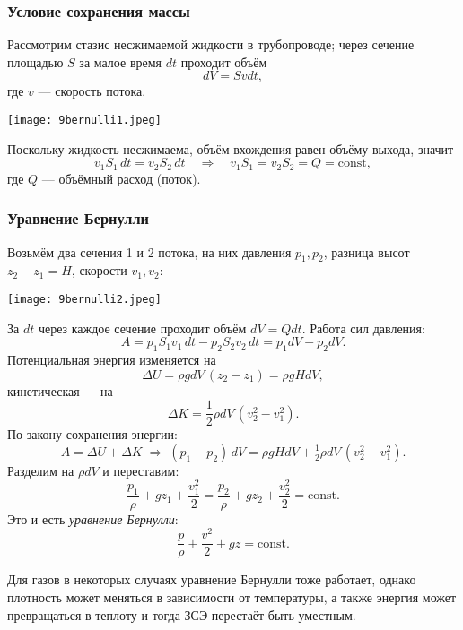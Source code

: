 \documentclass[12pt, a4paper]{article}%
\begin{document}
\subsubsection*{Условие сохранения массы}
Рассмотрим стазис несжимаемой жидкости в трубопроводе; через сечение площадью $S$ за малое время $dt$ проходит объём
\[
dV = Svdt,
\]
где $v$ — скорость потока.

\begin{center}
\texttt{[image: 9bernulli1.jpeg]}
\label{fig:mpr}
\end{center}


Поскольку жидкость несжимаема, объём вхождения равен объёму выхода, значит
\[
v_1 S_1\,dt = v_2 S_2\,dt
\quad\Longrightarrow\quad
v_1 S_1 = v_2 S_2 = Q = \text{const},
\]
где $Q$ — объёмный расход (поток).

\subsubsection*{Уравнение Бернулли}
Возьмём два сечения 1 и 2 потока, на них давления $p_1,p_2$, разница высот $z_2 - z_1 = H$, скорости $v_1,v_2$:

\begin{center}
\texttt{[image: 9bernulli2.jpeg]}
\label{fig:mpr}
\end{center}


За $dt$ через каждое сечение проходит объём $dV=Qdt$. Работа сил давления:
\[
A = p_1S_1v_1\,dt - p_2S_2v_2\,dt = p_1dV - p_2dV.
\]
Потенциальная энергия изменяется на
\[
\Delta U = \rho gdV\,(z_2 - z_1) = \rho gHdV,
\]
кинетическая — на
\[
\Delta K = \frac12\rho dV\,(v_2^2 - v_1^2).
\]
По закону сохранения энергии:
\[
A = \Delta U + \Delta K
\;\Longrightarrow\;
(p_1 - p_2)\,dV = \rho gHdV + \tfrac12\rho dV\,(v_2^2 - v_1^2).
\]
Разделим на $\rho dV$ и переставим:
\[
\frac{p_1}{\rho} + gz_1 + \frac{v_1^2}{2}
= \frac{p_2}{\rho} + gz_2 + \frac{v_2^2}{2}
= \text{const}.
\]
Это и есть \textit{уравнение Бернулли}:
\[
\frac{p}{\rho} + \frac{v^2}{2} + gz = \mathrm{const}.
\]

Для газов в некоторых случаях уравнение Бернулли тоже работает, однако плотность может меняться в зависимости от температуры, а также энергия может превращаться в теплоту и тогда ЗСЭ перестаёт быть уместным.
\end{document}
